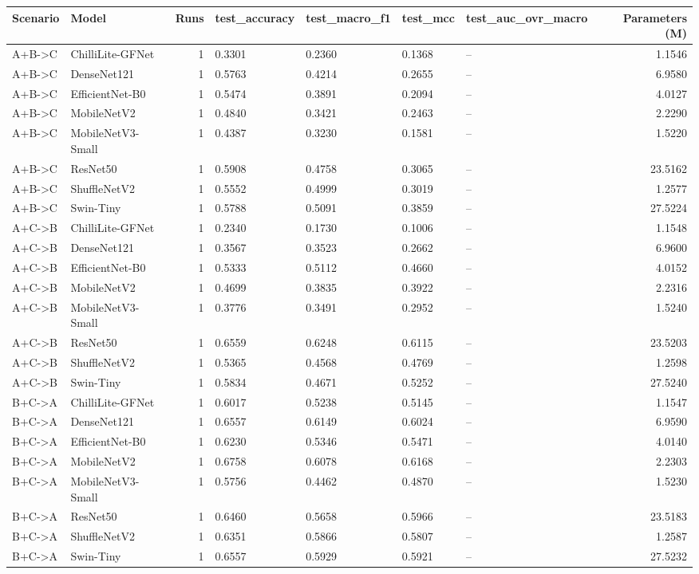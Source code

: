 \begin{tabular}{llrllllr}
\toprule
Scenario & Model & Runs & test\_accuracy & test\_macro\_f1 & test\_mcc & test\_auc\_ovr\_macro & Parameters (M) \\
\midrule
A+B->C & ChilliLite-GFNet & 1 & 0.3301 & 0.2360 & 0.1368 & -- & 1.1546 \\
A+B->C & DenseNet121 & 1 & 0.5763 & 0.4214 & 0.2655 & -- & 6.9580 \\
A+B->C & EfficientNet-B0 & 1 & 0.5474 & 0.3891 & 0.2094 & -- & 4.0127 \\
A+B->C & MobileNetV2 & 1 & 0.4840 & 0.3421 & 0.2463 & -- & 2.2290 \\
A+B->C & MobileNetV3-Small & 1 & 0.4387 & 0.3230 & 0.1581 & -- & 1.5220 \\
A+B->C & ResNet50 & 1 & 0.5908 & 0.4758 & 0.3065 & -- & 23.5162 \\
A+B->C & ShuffleNetV2 & 1 & 0.5552 & 0.4999 & 0.3019 & -- & 1.2577 \\
A+B->C & Swin-Tiny & 1 & 0.5788 & 0.5091 & 0.3859 & -- & 27.5224 \\
A+C->B & ChilliLite-GFNet & 1 & 0.2340 & 0.1730 & 0.1006 & -- & 1.1548 \\
A+C->B & DenseNet121 & 1 & 0.3567 & 0.3523 & 0.2662 & -- & 6.9600 \\
A+C->B & EfficientNet-B0 & 1 & 0.5333 & 0.5112 & 0.4660 & -- & 4.0152 \\
A+C->B & MobileNetV2 & 1 & 0.4699 & 0.3835 & 0.3922 & -- & 2.2316 \\
A+C->B & MobileNetV3-Small & 1 & 0.3776 & 0.3491 & 0.2952 & -- & 1.5240 \\
A+C->B & ResNet50 & 1 & 0.6559 & 0.6248 & 0.6115 & -- & 23.5203 \\
A+C->B & ShuffleNetV2 & 1 & 0.5365 & 0.4568 & 0.4769 & -- & 1.2598 \\
A+C->B & Swin-Tiny & 1 & 0.5834 & 0.4671 & 0.5252 & -- & 27.5240 \\
B+C->A & ChilliLite-GFNet & 1 & 0.6017 & 0.5238 & 0.5145 & -- & 1.1547 \\
B+C->A & DenseNet121 & 1 & 0.6557 & 0.6149 & 0.6024 & -- & 6.9590 \\
B+C->A & EfficientNet-B0 & 1 & 0.6230 & 0.5346 & 0.5471 & -- & 4.0140 \\
B+C->A & MobileNetV2 & 1 & 0.6758 & 0.6078 & 0.6168 & -- & 2.2303 \\
B+C->A & MobileNetV3-Small & 1 & 0.5756 & 0.4462 & 0.4870 & -- & 1.5230 \\
B+C->A & ResNet50 & 1 & 0.6460 & 0.5658 & 0.5966 & -- & 23.5183 \\
B+C->A & ShuffleNetV2 & 1 & 0.6351 & 0.5866 & 0.5807 & -- & 1.2587 \\
B+C->A & Swin-Tiny & 1 & 0.6557 & 0.5929 & 0.5921 & -- & 27.5232 \\
\bottomrule
\end{tabular}
